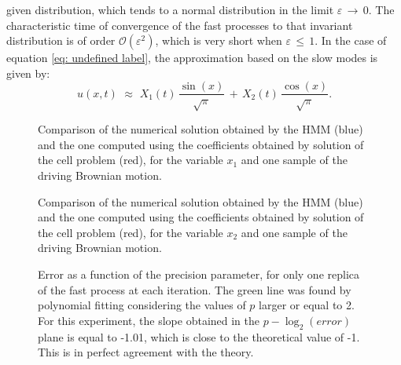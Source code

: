 given distribution, which tends to a normal distribution in the limit
${\varepsilon}\,\to\, 0$. The characteristic time of convergence of the fast
processes to that invariant distribution is of order $\mathcal
O({\varepsilon}^2)$, which is very short when ${\varepsilon}\,\leq\,1$. In the
case of equation \eqref{eq: undefined label}, the approximation based on the
slow modes is given by:
\begin{equation*}
    u(x,t) \,\,{\approx}\,\, X_1(t) \,\frac{\sin(x)}{\sqrt{\pi}} \,+\, X_2(t) \,\frac{\cos(x)}{\sqrt{\pi}}. 
\end{equation*}
\begin{figure}[h!]
    \begin{center}
        
    \end{center} 
    \caption{Comparison of the numerical solution obtained by the HMM (blue) and the one computed using the coefficients obtained by solution of the cell problem (red), for the variable $x_1$ and one sample of the driving Brownian motion.}
    \label{fig: spde different ps x1}
\end{figure}
\begin{figure}[h!]
    \begin{center}
        
    \end{center} 
    \caption{Comparison of the numerical solution obtained by the HMM (blue) and the one computed using the coefficients obtained by solution of the cell problem (red), for the variable $x_2$ and one sample of the driving Brownian motion.}
    \label{fig: spde different ps x2}
\end{figure}

\begin{figure}[h!]
    \begin{center}
        
    \end{center} 
    \caption{Error as a function of the precision parameter, for only one replica of the fast process at each iteration. The green line was found by polynomial fitting considering the values of $p$ larger or equal to 2. For this experiment, the slope obtained in the $p-\log_2(error)$ plane is equal to -1.01, which is close to the theoretical value of -1. This is in perfect agreement with the theory.} 
    \label{fig: spde error}
\end{figure}
%
